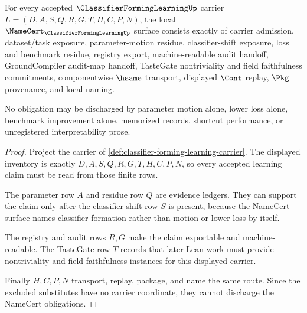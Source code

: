 \begin{theorem}
\label{thm:classifier-forming-learning-namecert-obligations}
For every accepted $\ClassifierFormingLearningUp$ carrier
$L=(D,A,S,Q,R,G,T,H,C,P,N)$, the local
$\NameCert_{\ClassifierFormingLearningUp}$ surface consists exactly of carrier
admission, dataset/task exposure, parameter-motion residue, classifier-shift
exposure, loss and benchmark residue, registry export, machine-readable audit
handoff, GroundCompiler audit-map handoff, TasteGate nontriviality and field
faithfulness commitments, componentwise $\hsame$ transport, displayed $\Cont$
replay, $\Pkg$ provenance, and local naming.

No obligation may be discharged by parameter motion alone, lower loss alone,
benchmark improvement alone, memorized records, shortcut performance, or
unregistered interpretability prose.
\end{theorem}
\begin{proof}
Project the carrier of
\autoref{def:classifier-forming-learning-carrier}. The displayed inventory is
exactly $D,A,S,Q,R,G,T,H,C,P,N$, so every accepted learning claim must be read
from those finite rows.

The parameter row $A$ and residue row $Q$ are evidence ledgers. They can
support the claim only after the classifier-shift row $S$ is present, because
the NameCert surface names classifier formation rather than motion or lower
loss by itself.

The registry and audit rows $R,G$ make the claim exportable and
machine-readable. The TasteGate row $T$ records that later Lean work must
provide nontriviality and field-faithfulness instances for this displayed
carrier.

Finally $H,C,P,N$ transport, replay, package, and name the same route. Since
the excluded substitutes have no carrier coordinate, they cannot discharge the
NameCert obligations.
\end{proof}

